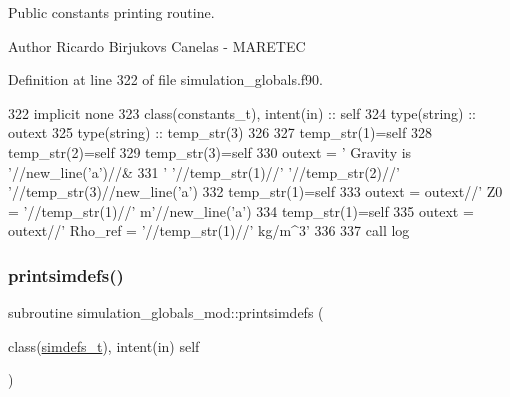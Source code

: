 Public constants printing routine. 

\begin{DoxyAuthor}{Author}
Ricardo Birjukovs Canelas -\/ M\+A\+R\+E\+T\+EC 
\end{DoxyAuthor}


Definition at line 322 of file simulation\+\_\+globals.\+f90.


\begin{DoxyCode}
322     \textcolor{keywordtype}{implicit none}
323     \textcolor{keywordtype}{class}(constants\_t), \textcolor{keywordtype}{intent(in)} :: self
324     \textcolor{keywordtype}{type}(string) :: outext
325     \textcolor{keywordtype}{type}(string) :: temp\_str(3)
326 
327     temp\_str(1)=self%
328     temp\_str(2)=self%
329     temp\_str(3)=self%
330     outext = \textcolor{stringliteral}{'      Gravity is '}//new\_line(\textcolor{stringliteral}{'a'})//&
331         \textcolor{stringliteral}{'       '}//temp\_str(1)//\textcolor{stringliteral}{' '}//temp\_str(2)//\textcolor{stringliteral}{' '}//temp\_str(3)//new\_line(\textcolor{stringliteral}{'a'})
332     temp\_str(1)=self%
333     outext = outext//\textcolor{stringliteral}{'       Z0 = '}//temp\_str(1)//\textcolor{stringliteral}{' m'}//new\_line(\textcolor{stringliteral}{'a'})
334     temp\_str(1)=self%
335     outext = outext//\textcolor{stringliteral}{'       Rho\_ref = '}//temp\_str(1)//\textcolor{stringliteral}{' kg/m^3'}
336 
337     \textcolor{keyword}{call }log%
\end{DoxyCode}
\mbox{\label{namespacesimulation__globals__mod_ad331ccf019de7ed531e37c655600f90f}} 
\subsubsection{\texorpdfstring{printsimdefs()}{printsimdefs()}}
{\footnotesize\ttfamily subroutine simulation\+\_\+globals\+\_\+mod\+::printsimdefs (\begin{DoxyParamCaption}\item[{class(\mbox{\hyperlink{structsimulation__globals__mod_1_1simdefs__t}{simdefs\+\_\+t}}), intent(in)}]{self }\end{DoxyParamCaption})\hspace{0.3cm}{\ttfamily [private]}}



